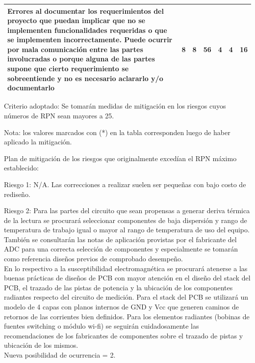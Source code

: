 \documentclass[11pt]{charter}
\begin{document}
\begin{table}[H]
\begin{tabularx}{\linewidth}{@{}|X|c|c|c|c|c|c|@{}}
Errores al documentar los requerimientos del proyecto que puedan implicar que no se implementen funcionalidades requeridas o que se implementen incorrectamente. Puede ocurrir por mala comunicación entre las partes involucradas o porque alguna de las partes supone que cierto requerimiento se sobreentiende y no es necesario aclararlo y/o documentarlo
& 8 & 8 & 56 & 4   &  4  &  16    \\ \hline
       
\end{tabularx}
\end{table}

Criterio adoptado: 
Se tomarán medidas de mitigación en los riesgos cuyos números de RPN sean mayores a 25.

Nota: los valores marcados con (*) en la tabla corresponden luego de haber aplicado la mitigación.

Plan de mitigación de los riesgos que originalmente excedían el RPN máximo establecido:
 
Riesgo 1: N/A. Las correcciones a realizar suelen ser pequeñas con bajo costo de rediseño.

Riesgo 2: Para las partes del circuito que sean propensas a generar deriva térmica de la lectura se procurará seleccionar componentes de baja dispersión y rango de temperatura de trabajo igual o mayor al rango de temperatura de uso del equipo. También se consultarán las notas de aplicación provistas por el fabricante del ADC para una correcta selección de componentes y especialmente se tomarán como referencia diseños previos de comprobado desempeño.\\ 
En lo respectivo a la susceptibilidad electromagnética se procurará atenerse a las buenas prácticas de diseños de PCB con mayor atención en el diseño del stack del PCB, el trazado de las pistas de potencia y la ubicación de los componentes radiantes respecto del circuito de medición. Para el stack del PCB se utilizará un modelo de 4 capas con planos internos de GND y Vcc que generen caminos de retornos de las corrientes bien definidos. Para los elementos radiantes (bobinas de fuentes switching o módulo wi-fi) se seguirán cuidadosamente las recomendaciones de los fabricantes de componentes sobre el trazado de pistas y ubicación de los mismos.\\
Nueva posibilidad de ocurrencia = 2. 
 
\end{document}
